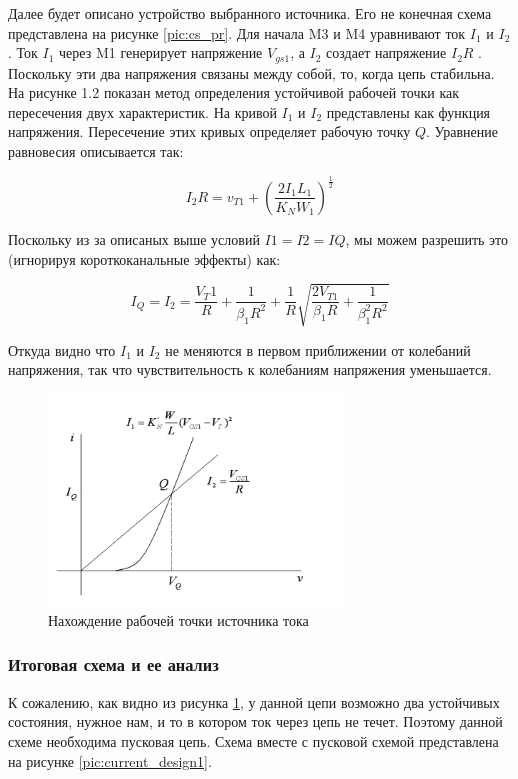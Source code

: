 \documentclass[a4paper,12pt]{article} %
\begin{document}
Далее будет описано устройство выбранного источника. Его не конечная схема представлена на рисунке \ref{pic:cs_pr}.
Для начала M3 и M4 уравнивают ток $ I_1 $ и $ I_2 $. Ток $I_1$ через M1 генерирует напряжение $V_{gs1}$, а $I_2$ создает напряжение $I_2 R $ . Поскольку эти два напряжения связаны между собой, то, когда цепь стабильна\cite{op_amp_comp12}. На рисунке 1.2 показан метод определения устойчивой рабочей  точки как пересечения двух характеристик. 
 На кривой $ I_1 $ и $ I_2 $ представлены как функция напряжения. Пересечение этих кривых определяет рабочую точку $Q$. Уравнение равновесия описывается так: 

 $$ I_2 R = v_{T1} + ( \frac{2I_1 L_1}{ K_N W_1})^{\frac{1}{2}} $$

 Поскольку из за описаных выше условий $ I1=I2=IQ $, мы можем разрешить это (игнорируя короткоканальные эффекты) как:

\begin{equation}
    I_Q = I_2 =  \frac{V_T1}{R} + \frac{1}{\beta_1 R^2} + \frac{1}{R} \sqrt{ \frac{2 V_{T1}}{\beta_1 R} + \frac{1}{\beta_1^2 R^2}}
\end{equation}

Откуда видно что $I_1$ и $I_2$ не меняются в первом приближении от колебаний напряжения, так что чувствительность к колебаниям напряжения уменьшается. 




\begin{figure}[]
    \centering
    \includegraphics[width=0.7\textwidth]{current_source/plot.png}
    \caption{Нахождение рабочей точки источника тока}
    \label{pic:cs_plot}
\end{figure}




\subsubsection{Итоговая схема и ее анализ}
К сожалению, как видно из рисунка \ref{pic:cs_plot}, у данной цепи возможно два устойчивых состояния, нужное нам, и то в котором ток через цепь не течет. Поэтому данной схеме необходима пусковая цепь\cite{op_amp_comp13}. Схема вместе с пусковой схемой представлена на  рисунке \ref{pic:current_design1}.%
\end{document}
